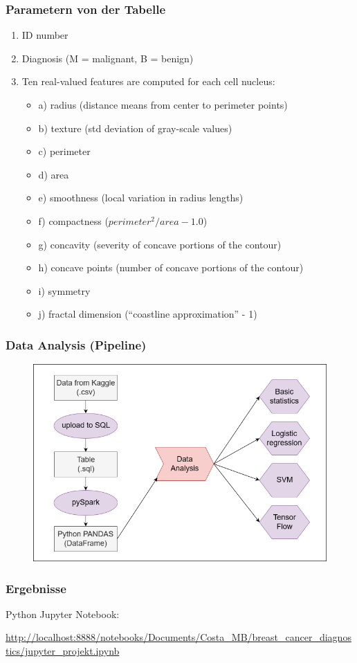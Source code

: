 \documentclass{beamer}
\begin{document}
    \begin{frame}
    \frametitle{Parametern von der Tabelle}

    \begin{enumerate}
    \item ID number
    \item Diagnosis (M = malignant, B = benign)
    \item Ten real-valued features are computed for each cell nucleus:
        \begin{itemize}    
        \item a) radius (distance means from center to perimeter points)
        \item b) texture (std deviation of gray-scale values)
        \item c) perimeter
        \item d) area
        \item e) smoothness (local variation in radius lengths)
        \item f) compactness ($perimeter^2 / area - 1.0$)
        \item g) concavity (severity of concave portions of the contour)
        \item h) concave points (number of concave portions of the contour)
        \item i) symmetry
        \item j) fractal dimension (``coastline approximation'' - 1)
        \end{itemize}
    \end{enumerate}
    \end{frame}
    
    \begin{frame}
    \frametitle{Data Analysis (Pipeline)}
    \begin{figure}
    \includegraphics[width=0.85\columnwidth]{pipeline_cancer_project.png}
    \end{figure}
    \end{frame}
    
    \begin{frame}
    \frametitle{Ergebnisse}
    Python Jupyter Notebook:
    
    \url{http://localhost:8888/notebooks/Documents/Costa_MB/breast_cancer_diagnostics/jupyter_projekt.ipynb}
    \end{frame}
\end{document}
